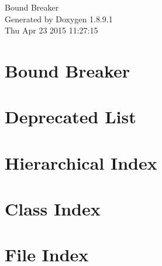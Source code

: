 \documentclass[twoside]{book}
\newcommand{\+}{\discretionary{\mbox{\scriptsize$\hookleftarrow$}}{}{}}
\newcommand{\clearemptydoublepage}{%
  \newpage{\pagestyle{empty}\cleardoublepage}%
}
\begin{document}
\hypersetup{pageanchor=false,
             bookmarks=true,
             bookmarksnumbered=true,
             pdfencoding=unicode
            }
\begin{titlepage}
\vspace*{7cm}
\begin{center}%
{\Large Bound Breaker }\\
\vspace*{1cm}
{\large Generated by Doxygen 1.8.9.1}\\
\vspace*{0.5cm}
{\small Thu Apr 23 2015 11:27:15}\\
\end{center}
\end{titlepage}
\clearemptydoublepage
\tableofcontents
\clearemptydoublepage
{}
\hypersetup{pageanchor=true}

\chapter{Bound Breaker}
\label{md___users_jscottrichards__documents__git_hub__bound_breaker__r_e_a_d_m_e}
\hypertarget{md___users_jscottrichards__documents__git_hub__bound_breaker__r_e_a_d_m_e}{}

\chapter{Deprecated List}
\label{deprecated}
\hypertarget{deprecated}{}

\chapter{Hierarchical Index}

\chapter{Class Index}

\chapter{File Index}

\end{document}
